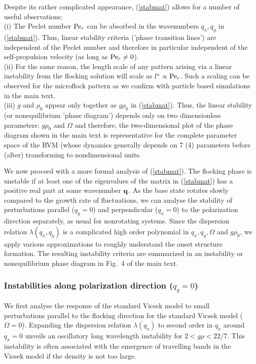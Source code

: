 \documentclass[aps,twocolumn,showlabels,showrefs,amsmath,amssymb,pre,superscriptaddress, floatfix, colors]{revtex4}
\newcommand{\1}{\begin{equation}}
\newcommand{\2}{\end{equation}}
\newcommand{\4}[2]{{\frac{#1}{#2}}}
\begin{document}
Despite its rather complicated appearance, (\ref{stabmat}) allows for a number of useful observations:
\\(i) The Peclet number ${\rm Pe}_r$ can be absorbed in the wavenumbers $q_x,q_y$ in (\ref{stabmat}). Thus, 
linear stability criteria ('phase transition lines') are independent of the Peclet number and therefore in particular independent of the self-propulsion velocity (as long as ${\rm Pe}_r \neq 0$).
\\(ii) For the same reason, the length scale of any pattern arising via a linear instability from the flocking solution will scale as $l^\ast \propto {\rm Pe}_r$.
Such a scaling can be observed for the microflock pattern as we confirm with particle based simulations in the main text.
\\(iii) $g$ and $\rho_0$ appear only together as $g \rho_0$ in (\ref{stabmat}). Thus, the linear stability (or nonequilibrium 'phase diagram') depends only on two dimensionless parameters: $g \rho_0$ and $\Omega$
and therefore, the two-dimensional plot of the phase diagram shown in the main text is representative for the complete parameter space of the RVM
(whose dynamics generally depends on 7 (4) parameters before (after) transforming to nondimensional units. 

We now proceed with a more formal analysis of (\ref{stabmat}).
The flocking phase is unstable if at least one of the eigenvalues of the matrix in 
(\ref{stabmat}) has a positive real part at some wavenumber ${\bf q}$. 
As the base state rotates slowly compared to the growth rate of fluctuations, we can analyse the stability of perturbations parallel ($q_y=0$) and perpendicular ($q_x=0$) to the polarization direction separately, 
as usual for nonrotating systems. 
Since the dispersion relation $\lambda(q_x,q_y)$ is a complicated high order polynomial in $q_x,q_y, \Omega$ and $g \rho_0$, we apply various 
approximations to roughly understand the onset structure formation. 
The resulting instability criteria are summarized in an instability or nonequilibrium phase diagram in Fig.~4 of the main text. 


\subsubsection{Instabilities along polarization direction ($q_y=0$)}
We first analyse the response of the standard Vicsek model to small perturbations parallel to the flocking direction for the standard Vicsek model ($\Omega=0$).
Expanding the dispersion relation $\lambda(q_x)$ to second order in $q_x$ around $q_x=0$
unveils an oscillatory long wavelength instability for $2<g \rho<22/7$. This instability is often associated with the emergence of travelling bands in the Vicsek model
if the density is not too large. 
\end{document}
